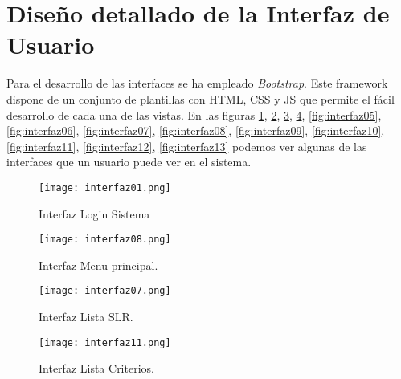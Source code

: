 \section{Diseño detallado de la Interfaz de Usuario} 

Para el desarrollo de las interfaces se ha empleado \textit{Bootstrap}\cite{boot2016}. Este framework dispone de un conjunto de plantillas con HTML, CSS y JS que permite el fácil desarrollo de cada una de las vistas. En las figuras \ref{fig:interfaz01}, \ref{fig:interfaz02}, \ref{fig:interfaz03}, \ref{fig:interfaz04}, \ref{fig:interfaz05}, \ref{fig:interfaz06}, \ref{fig:interfaz07}, \ref{fig:interfaz08}, \ref{fig:interfaz09}, \ref{fig:interfaz10}, \ref{fig:interfaz11}, \ref{fig:interfaz12}, \ref{fig:interfaz13} podemos ver algunas de las interfaces que un usuario puede ver en el sistema.

\begin{figure}[!hpt]
	\begin{center} 
		\texttt{[image: interfaz01.png]}
		\caption{Interfaz Login Sistema}
		\label{fig:interfaz01}
	\end{center}
\end{figure}

\begin{figure}[!hpt]
	\begin{center} 
		\texttt{[image: interfaz08.png]}
		\caption{Interfaz Menu principal.}
		\label{fig:interfaz02}
	\end{center}
\end{figure}

\begin{figure}[!hpt]
	\begin{center} 
		\texttt{[image: interfaz07.png]}
		\caption{Interfaz Lista SLR.}
		\label{fig:interfaz03}
	\end{center}
\end{figure}

\begin{figure}[!hpt]
	\begin{center} 
		\texttt{[image: interfaz11.png]}
		\caption{Interfaz Lista Criterios.}
		\label{fig:interfaz04}
	\end{center}
\end{figure}

